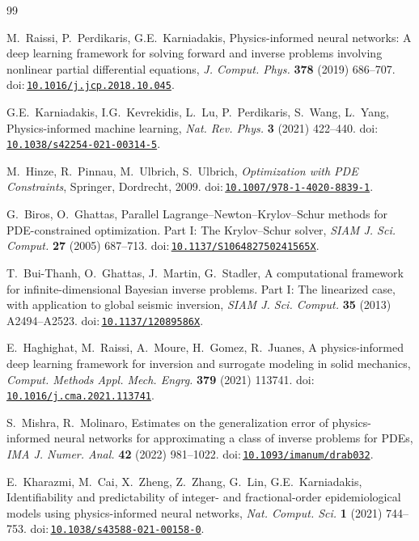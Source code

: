 \documentclass[preprint,11pt]{elsarticle}
\newcommand{\doi}[1]{doi:\,\mbox{\href{https://doi.org/#1}{\nolinkurl{#1}}}}
\begin{document}
\begin{thebibliography}{99}

\small
{}
\setlength{\bibsep}{3.5pt}
\raggedright

M.~Raissi, P.~Perdikaris, G.E.~Karniadakis,
Physics-informed neural networks: A deep learning framework for solving forward and inverse problems involving nonlinear partial differential equations,
\textit{J. Comput. Phys.} \textbf{378} (2019) 686--707.
\doi{10.1016/j.jcp.2018.10.045}.

G.E.~Karniadakis, I.G.~Kevrekidis, L.~Lu, P.~Perdikaris, S.~Wang, L.~Yang,
Physics-informed machine learning,
\textit{Nat. Rev. Phys.} \textbf{3} (2021) 422--440.
\doi{10.1038/s42254-021-00314-5}.

M.~Hinze, R.~Pinnau, M.~Ulbrich, S.~Ulbrich,
\textit{Optimization with PDE Constraints},
Springer, Dordrecht, 2009.
\doi{10.1007/978-1-4020-8839-1}.

G.~Biros, O.~Ghattas,
Parallel Lagrange--Newton--Krylov--Schur methods for PDE-constrained optimization. Part I: The Krylov--Schur solver,
\textit{SIAM J. Sci. Comput.} \textbf{27} (2005) 687--713.
\doi{10.1137/S106482750241565X}.

T.~Bui-Thanh, O.~Ghattas, J.~Martin, G.~Stadler,
A computational framework for infinite-dimensional Bayesian inverse problems. Part I: The linearized case, with application to global seismic inversion,
\textit{SIAM J. Sci. Comput.} \textbf{35} (2013) A2494--A2523.
\doi{10.1137/12089586X}.

E.~Haghighat, M.~Raissi, A.~Moure, H.~Gomez, R.~Juanes,
A physics-informed deep learning framework for inversion and surrogate modeling in solid mechanics,
\textit{Comput. Methods Appl. Mech. Engrg.} \textbf{379} (2021) 113741.
\doi{10.1016/j.cma.2021.113741}.

S.~Mishra, R.~Molinaro,
Estimates on the generalization error of physics-informed neural networks for approximating a class of inverse problems for PDEs,
\textit{IMA J. Numer. Anal.} \textbf{42} (2022) 981--1022.
\doi{10.1093/imanum/drab032}.

E.~Kharazmi, M.~Cai, X.~Zheng, Z.~Zhang, G.~Lin, G.E.~Karniadakis,
Identifiability and predictability of integer- and fractional-order epidemiological models using physics-informed neural networks,
\textit{Nat. Comput. Sci.} \textbf{1} (2021) 744--753.
\doi{10.1038/s43588-021-00158-0}.


\end{thebibliography}
\end{document}
